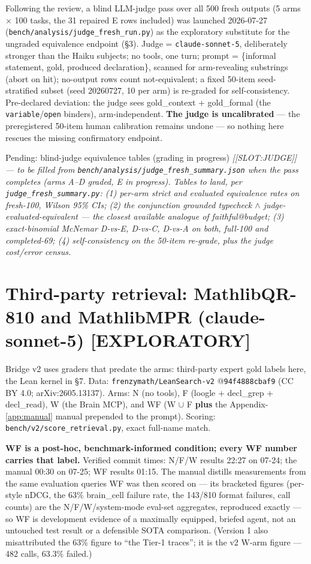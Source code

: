 \documentclass[10pt]{article}
\newcommand{\code}[1]{\texttt{#1}}
\begin{document}
Following the review, a blind LLM-judge pass over all 500 fresh outputs
(5 arms $\times$ 100 tasks, the 31 repaired E rows included) was launched
2026-07-27 (\code{bench/analysis/judge\_fresh\_run.py}) as the exploratory
substitute for the ungraded equivalence endpoint (\S3). Judge =
\code{claude-sonnet-5}, deliberately stronger than the Haiku subjects; no
tools, one turn; prompt = \{informal statement, gold, produced
declaration\}, scanned for arm-revealing substrings (abort on hit);
no-output rows count not-equivalent; a fixed 50-item seed-stratified
subset (seed 20260727, 10 per arm) is re-graded for self-consistency.
Pre-declared deviation: the judge sees gold\_context + gold\_formal (the
\code{variable}/\code{open} binders), arm-independent. \textbf{The judge
is uncalibrated} --- the preregistered 50-item human calibration remains
undone --- so nothing here rescues the missing confirmatory endpoint.

\begin{pendingbox}{Pending: blind-judge equivalence tables (grading in progress)}
\itshape
[[SLOT:JUDGE]] --- to be filled from
\code{bench/analysis/judge\_fresh\_summary.json} when the pass completes
(arms A--D graded, E in progress). Tables to land, per
\code{judge\_fresh\_summary.py}: (1) per-arm strict and evaluated
equivalence rates on fresh-100, Wilson 95\% CIs; (2) the conjunction
grounded typecheck $\wedge$ judge-evaluated-equivalent --- the closest
available analogue of faithful@budget; (3) exact-binomial McNemar D-vs-E,
D-vs-C, D-vs-A on both, full-100 and completed-69; (4) self-consistency on
the 50-item re-grade, plus the judge cost/error census.
\end{pendingbox}

\section{Third-party retrieval: MathlibQR-810 and MathlibMPR
(claude-sonnet-5) [EXPLORATORY]}\label{sec:retrieval}

Bridge v2 uses graders that predate the arms: third-party expert gold
labels here, the Lean kernel in \S7. Data: \code{frenzymath/LeanSearch-v2}
@\code{94f4888cbaf9} (CC BY 4.0; arXiv:2605.13137). Arms: N (no tools), F
(loogle + decl\_grep + decl\_read), W (the Brain MCP), and WF (W $\cup$ F
\textbf{plus} the Appendix-\ref{app:manual} manual prepended to the
prompt). Scoring: \code{bench/v2/score\_retrieval.py}, exact full-name
match.

\textbf{WF is a post-hoc, benchmark-informed condition; every WF number
carries that label.} Verified commit times: N/F/W results 22:27 on 07-24;
the manual 00:30 on 07-25; WF results 01:15. The manual distills
measurements from the same evaluation queries WF was then scored on ---
its bracketed figures (per-style nDCG, the 63\% brain\_cell failure rate,
the 143/810 format failures, call counts) are the N/F/W/system-mode
eval-set aggregates, reproduced exactly --- so WF is development evidence
of a maximally equipped, briefed agent, not an untouched test result or a
defensible SOTA comparison. (Version 1 also misattributed the 63\% figure
to ``the Tier-1 traces''; it is the v2 W-arm figure --- 482 calls, 63.3\%
failed.)
\end{document}

